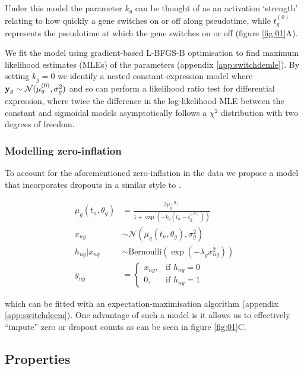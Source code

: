 Under this model the parameter $k_g$ can be thought of as an activation `strength' relating to how quickly a gene switches on or off along pseudotime, while $t^{(0)}_g$ represents the pseudotime at which the gene switches on or off (figure \ref{fig:01}A).

We fit the model using gradient-based L-BFGS-B optimisation to find maximum likelihood estimates (MLEs) of the parameters (appendix \ref{app:switchdemle}). By setting $k_g = 0$ we identify a nested constant-expression model where ${\bf y}_g \sim \mathcal{N}({\mu^{(0)}_g}, \sigma^2_g)$ and so can perform a likelihood ratio test for differential expression, where twice the difference in the log-likelihood MLE between the constant and sigmoidal models asymptotically follows a $\chi^2$ distribution with two degrees of freedom.

\subsubsection{Modelling zero-inflation}

To account for the aforementioned zero-inflation in the data we propose a model that incorporates dropouts in a similar style to \cite{pierson2015zifa}.

\begin{equation}
\begin{aligned}
\mu_g(t_n, \theta_g) & = \frac{2 \mu^{(0)}_g}{1 + \exp\left(-k_g(t_n - t^{(0)}_g)\right)} \\
x_{ng} & \sim \mathcal{N}(\mu_g(t_n, \theta_g), \sigma_g^2) \\
h_{ng} | x_{ng} & \sim \mathrm{Bernoulli}(\exp(-\lambda_g x_{ng}^2)) \\
    y_{ng} &=
\begin{cases}
    x_{ng} ,& \text{if } h_{ng} = 0\\
    0,  & \text{if } h_{ng} = 1
\end{cases}
\end{aligned}
\end{equation}

which can be fitted with an expectation-maximisation algorithm (appendix \ref{app:switchdeem}). One advantage of such a model is it allows us to effectively ``impute'' zero or dropout counts as can be seen in figure \ref{fig:01}C.


\subsection{Properties}

